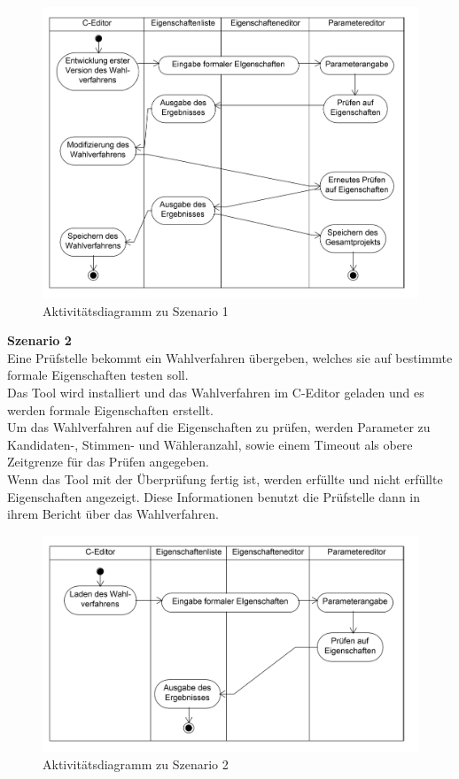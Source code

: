 \documentclass[a4paper]{scrreprt}
\begin{document}
\begin{figure}[H]
\includegraphics[scale=0.12]{ActivityDiagramScenario1.png}
\caption{Aktivitätsdiagramm zu Szenario 1}
\label{Packet-scetch}
\end{figure}
\textbf{Szenario 2}\\
Eine Prüfstelle bekommt ein Wahlverfahren übergeben, welches sie auf bestimmte formale Eigenschaften testen soll.\\
Das Tool wird installiert und das Wahlverfahren im C-Editor geladen und es werden formale Eigenschaften erstellt.\\
Um das Wahlverfahren auf die Eigenschaften zu prüfen, werden Parameter zu \\Kandidaten-, Stimmen- und Wähleranzahl, sowie einem Timeout als obere Zeitgrenze für das Prüfen angegeben.\\
Wenn das Tool mit der Überprüfung fertig ist, werden erfüllte und nicht erfüllte Eigenschaften angezeigt. Diese Informationen benutzt die Prüfstelle dann in ihrem Bericht über das Wahlverfahren.\\

\begin{figure}[H]
\includegraphics[scale=0.12]{ActivityDiagramScenario2.png}
\caption{Aktivitätsdiagramm zu Szenario 2}
\label{Packet-scetch}
\end{figure}
\end{document}
